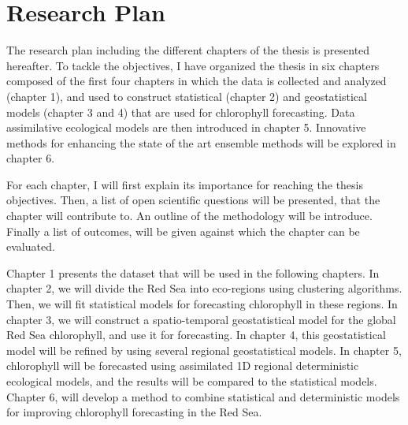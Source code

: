 \chapter{Research Plan}

The research plan including the different chapters of the thesis is presented
hereafter. To tackle the objectives, I have organized the thesis in six
chapters composed of the first four chapters in which the data is collected and
analyzed (chapter 1), and used to construct statistical (chapter 2) and
geostatistical models (chapter 3 and 4) that are used for chlorophyll
forecasting. Data assimilative ecological models are then introduced in chapter
5. Innovative methods for enhancing the state of the art ensemble methods will
be explored in chapter 6.

For each chapter, I will first explain its importance for reaching the thesis
objectives. Then, a list of open scientific questions will be presented, that
the chapter will contribute to. An outline of the methodology will be
introduce. Finally a list of outcomes, will be given against which the chapter
can be evaluated.

Chapter 1 presents the dataset that will be used in the following chapters.  In
chapter 2, we will divide the Red Sea into eco-regions using clustering
algorithms. Then, we will fit statistical models for forecasting chlorophyll in
these regions. In chapter 3, we will construct a spatio-temporal geostatistical
model for the global Red Sea chlorophyll, and use it for forecasting. In
chapter 4, this geostatistical model will be refined by using several regional
geostatistical models. In chapter 5, chlorophyll will be forecasted using
assimilated 1D regional deterministic ecological models, and the results will
be compared to the statistical models.  Chapter 6, will develop a method to
combine statistical and deterministic models for improving chlorophyll
forecasting in the Red Sea.
